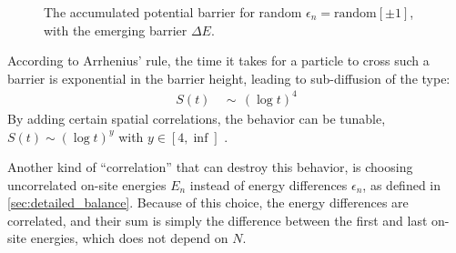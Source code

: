 \begin{figure}
\caption{The accumulated potential barrier for random $\epsilon_n = \textrm{random}[\pm 1]$, with the 
     emerging barrier $\Delta E$.}
     \label{fig:sinai}
\end{figure}


According to Arrhenius' rule, the time it takes for a particle to cross
such a barrier is exponential in the barrier height, leading to sub-diffusion
of the type:
\begin{align}
S(t)\ \ &\sim\ \  (\log t)^4
\end{align}
By adding certain spatial correlations, the behavior can be tunable, 
$S(t) \sim (\log t)^y$ with $y \in [4,\inf]$ \cite{stanley_generalisation_1987}.


Another kind of ``correlation'' that can destroy this behavior, is
choosing uncorrelated on-site energies $E_n$ instead of energy differences $\epsilon_n$,
as defined in \autoref{sec:detailed_balance}. 
Because of this choice, the energy differences are correlated, and their
sum is simply the difference between the first and last on-site energies,
which does not depend on $N$.


